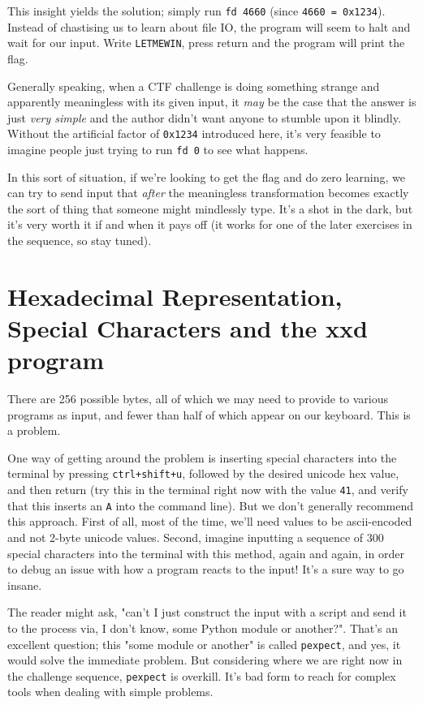 \documentclass{article}
\newcommand{\xcode}[2]{\colorbox{ubuntuback}{\lstinline[language=#1]|#2|}}
\newcommand{\code}[1]{\colorbox{ubuntuback}{\texttt{#1}}}
\begin{document}
This insight yields the solution; simply run \code{fd 4660} (since \code{4660 = 0x1234}). Instead of chastising us to learn about file IO, the program will seem to halt and wait for our input. Write \code{LETMEWIN}, press return and the program will print the flag.

Generally speaking, when a CTF challenge is doing something strange and apparently meaningless with its given input, it \textit{may} be the case that the answer is just \textit{very simple} and the author didn't want anyone to stumble upon it blindly. Without the artificial factor of \code{0x1234} introduced here, it's very feasible to imagine people just trying to run \xcode{bash}{fd 0} to see what happens. 

In this sort of situation, if we're looking to get the flag and do zero learning, we can try to send input that \textit{after} the meaningless transformation becomes exactly the sort of thing that someone might mindlessly type. It's a shot in the dark, but it's very worth it if and when it pays off (it works for one of the later exercises in the sequence, so stay tuned).

\section{Hexadecimal Representation, Special Characters and the xxd program}
There are 256 possible bytes, all of which we may need to provide to various programs as input, and fewer than half of which appear on our keyboard. This is a problem.

One way of getting around the problem is inserting special characters into the terminal by pressing \code{ctrl+shift+u}, followed by the desired unicode hex value, and then return (try this in the terminal right now with the value \code{41}, and verify that this inserts an \code{A} into the command line). But we don't generally recommend this approach. First of all, most of the time, we'll need values to be ascii-encoded and not 2-byte unicode values. Second, imagine inputting a sequence of 300 special characters into the terminal with this method, again and again, in order to debug an issue with how a program reacts to the input! It's a sure way to go insane.

The reader might ask, "can't I just construct the input with a script and send it to the process via, I don't know, some Python module or another?". That's an excellent question; this "some module or another" is called \code{pexpect}, and yes, it would solve the immediate problem. But considering where we are right now in the challenge sequence, \code{pexpect} is overkill. It's bad form to reach for complex tools when dealing with simple problems.
\end{document}
